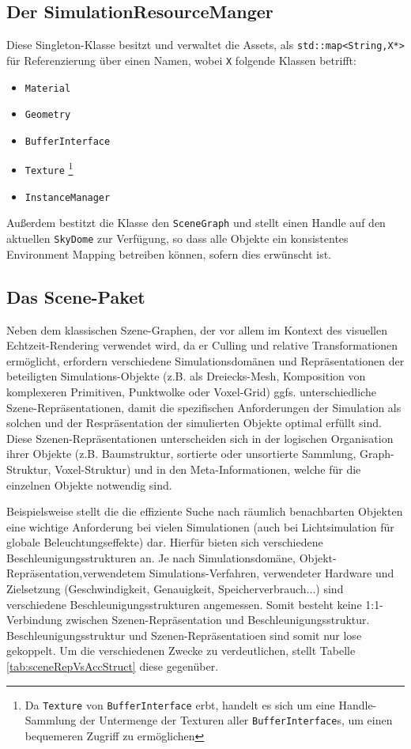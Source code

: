 \subsection{Der SimulationResourceManger}
	Diese Singleton-Klasse besitzt und verwaltet die Assets,\linebreak 
	als \lstinline|std::map<String,X*>| für Referenzierung über einen Namen, 
	wobei \lstinline|X| folgende Klassen betrifft: 
	\begin{itemize}
		\item \lstinline|Material|
		\item \lstinline|Geometry|
		\item \lstinline|BufferInterface|
		\item \lstinline|Texture| \footnote{Da \lstinline|Texture| von \lstinline|BufferInterface| erbt, 
		handelt es sich um eine Handle-Sammlung der Untermenge der Texturen aller \lstinline|BufferInterface|s,
		um einen bequemeren Zugriff zu ermöglichen}
		\item \lstinline|InstanceManager|
	\end{itemize}
	Außerdem bestitzt die Klasse den \lstinline|SceneGraph| und stellt einen Handle auf den aktuellen 
	\lstinline|SkyDome| zur Verfügung, so dass alle Objekte ein konsistentes Environment Mapping 
	betreiben können, sofern dies erwünscht ist.

		
\subsection{Das Scene-Paket}		
	Neben dem klassischen Szene-Graphen, der vor allem im Kontext des visuellen Echtzeit-Rendering verwendet wird,
	da er Culling und relative Transformationen ermöglicht, 
	erfordern verschiedene Simulationsdomänen und Repräsentationen der beteiligten Simulations-Objekte
	(z.B. als Dreiecks-Mesh, Komposition von komplexeren Primitiven, Punktwolke oder Voxel-Grid)  ggfs. 
	unterschiedliche Szene-Repräsentationen, damit die spezifischen Anforderungen der Simulation als solchen und der
	Respräsentation der simulierten Objekte optimal erfüllt sind.\\
	Diese Szenen-Repräsentationen unterscheiden sich in der logischen Organisation ihrer Objekte 
	(z.B. Baumstruktur, sortierte oder unsortierte Sammlung, Graph-Struktur, Voxel-Struktur) 
	und in den Meta-Informationen, welche für die einzelnen	Objekte notwendig sind.
	
	Beispielsweise stellt die die effiziente Suche nach räumlich benachbarten Objekten eine wichtige Anforderung
	bei vielen Simulationen (auch bei Lichtsimulation für globale Beleuchtungseffekte) dar.
	Hierfür bieten sich verschiedene Beschleunigungsstrukturen an. Je nach Simulationsdomäne, 
	Objekt-Repräsentation,verwendetem Simulations-Verfahren, verwendeter Hardware und Zielsetzung 
	(Geschwindigkeit, Genauigkeit, Speicherverbrauch...) sind verschiedene Beschleunigungsstrukturen angemessen.
	Somit besteht keine 1:1-Verbindung zwischen Szenen-Repräsentation und Beschleunigungsstruktur.\\
	Beschleunigungsstruktur und Szenen-Repräsentatioen sind somit nur lose gekoppelt.
	Um die verschiedenen Zwecke zu verdeutlichen, stellt Tabelle \ref{tab:sceneRepVsAccStruct} diese gegenüber.

